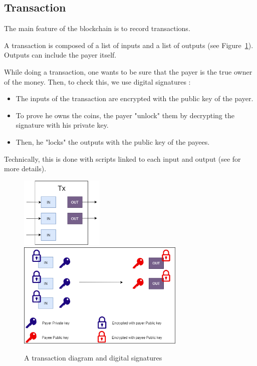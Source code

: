   \subsection{Transaction}

The main feature of the blockchain is to record transactions.

A transaction is composed of a list of inputs and a list of outputs (see Figure~\ref{transaction}). Outputs can include the payer itself. \newline

While doing a transaction, one wants to be sure that the payer is the true owner of the money. Then, to check this,  we use digital signatures :

\begin{itemize}
  \item The inputs of the transaction are encrypted with the public key of the payer.
  \item To prove he owns the coins, the payer "unlock" them by decrypting the signature with his private key.
  \item Then, he "locks" the outputs with the public key of the payees.
\end{itemize}

Technically, this is done with scripts linked to each input and output (see \cite{broken_crypto_primitives} for more details).


\begin{figure}[ht]
\centering
\includegraphics[width=4cm]{Figures/Transaction}
\hspace{1cm}
\includegraphics[width=8cm]{Figures/Transaction2}
\caption{A transaction diagram and digital signatures}
\label{transaction}
\end{figure}

